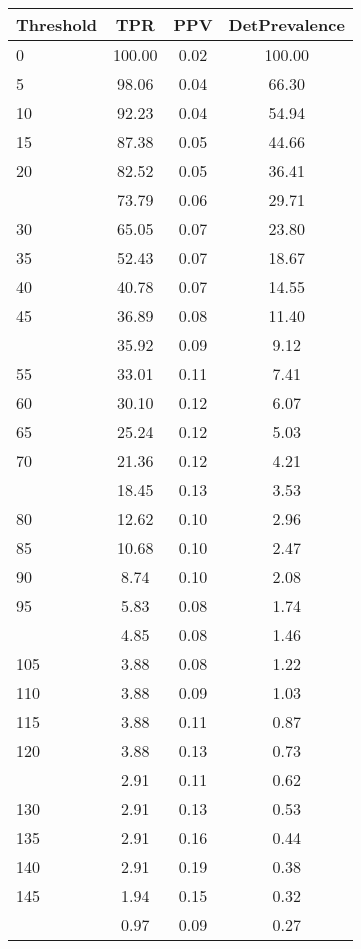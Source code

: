 \begin{table}[ht]
\centering
\begin{tabular}{lccc}
  \toprule
Threshold & TPR & PPV & DetPrevalence \\ 
  \midrule
0 & 100.00 & 0.02 & 100.00 \\ 
  5 & 98.06 & 0.04 & 66.30 \\ 
  10 & 92.23 & 0.04 & 54.94 \\ 
  15 & 87.38 & 0.05 & 44.66 \\ 
  20 & 82.52 & 0.05 & 36.41 \\ 
   \addlinespace
25 & 73.79 & 0.06 & 29.71 \\ 
  30 & 65.05 & 0.07 & 23.80 \\ 
  35 & 52.43 & 0.07 & 18.67 \\ 
  40 & 40.78 & 0.07 & 14.55 \\ 
  45 & 36.89 & 0.08 & 11.40 \\ 
   \addlinespace
50 & 35.92 & 0.09 & 9.12 \\ 
  55 & 33.01 & 0.11 & 7.41 \\ 
  60 & 30.10 & 0.12 & 6.07 \\ 
  65 & 25.24 & 0.12 & 5.03 \\ 
  70 & 21.36 & 0.12 & 4.21 \\ 
   \addlinespace
75 & 18.45 & 0.13 & 3.53 \\ 
  80 & 12.62 & 0.10 & 2.96 \\ 
  85 & 10.68 & 0.10 & 2.47 \\ 
  90 & 8.74 & 0.10 & 2.08 \\ 
  95 & 5.83 & 0.08 & 1.74 \\ 
   \addlinespace
100 & 4.85 & 0.08 & 1.46 \\ 
  105 & 3.88 & 0.08 & 1.22 \\ 
  110 & 3.88 & 0.09 & 1.03 \\ 
  115 & 3.88 & 0.11 & 0.87 \\ 
  120 & 3.88 & 0.13 & 0.73 \\ 
   \addlinespace
125 & 2.91 & 0.11 & 0.62 \\ 
  130 & 2.91 & 0.13 & 0.53 \\ 
  135 & 2.91 & 0.16 & 0.44 \\ 
  140 & 2.91 & 0.19 & 0.38 \\ 
  145 & 1.94 & 0.15 & 0.32 \\ 
   \addlinespace
150 & 0.97 & 0.09 & 0.27 \\ 

\end{tabular}
\end{table}
